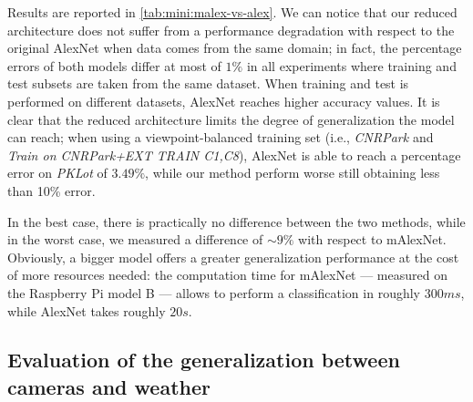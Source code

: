 Results are reported in \ref{tab:mini:malex-vs-alex}.
We can notice that our reduced architecture does not suffer from a performance degradation with respect to the original AlexNet when data comes from the same domain;
in fact, the percentage errors of both models differ at most of $1\%$ in all experiments where training and test subsets are taken from the same dataset.
When training and test is performed on different datasets, AlexNet reaches higher accuracy values.
It is clear that the reduced architecture limits the degree of generalization the model can reach;
when using a viewpoint-balanced training set (i.e., \emph{CNRPark} and \emph{Train on CNRPark+EXT TRAIN C1,C8}), AlexNet is able to reach a percentage error on \emph{PKLot} of $3.49\%$, while our method perform worse still obtaining less than 10\% error.

In the best case, there is practically no difference between the two methods, while in the worst case, we measured a difference of $\sim 9\%$ with respect to mAlexNet.
Obviously, a bigger model offers a greater generalization performance at the cost of more resources needed:
the computation time for mAlexNet --- measured on the Raspberry Pi model B --- allows to perform a classification in roughly $300ms$, while AlexNet takes roughly $20s$.

\subsection{Evaluation of the generalization between cameras and weather}


